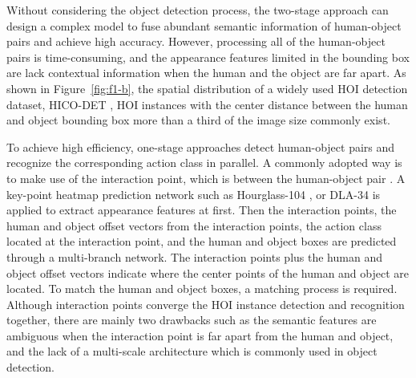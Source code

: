\documentclass[10pt,twocolumn,letterpaper]{article}
\begin{document}
Without considering the object detection process, the two-stage approach can design a complex model to fuse abundant semantic information of human-object pairs and achieve high accuracy.
However, processing all of the human-object pairs is time-consuming, and the appearance features limited in the bounding box are lack contextual information when the human and the object are far apart.
As shown in Figure~\ref{fig:f1-b}, the spatial distribution of a widely used HOI detection dataset, HICO-DET \cite{chao2018learning}, HOI instances with the center distance between the human and object bounding box more than a third of the image size commonly exist.

To achieve high efficiency, one-stage approaches
\cite{gkioxari2018detecting,liao2020ppdm,kim2021hotr,zou2021end,chen2021reformulating,tamura2021qpic,
   zhong2021glance,kim2020uniondet,wang2020learning}
detect human-object pairs and recognize the corresponding action class in parallel.
A commonly adopted way is to make use of the interaction point, which is between the human-object pair \cite{liao2020ppdm,zhong2021glance,wang2020learning}.
A key-point heatmap prediction network such as Hourglass-104 \cite{newell2016stacked}, or DLA-34 \cite{yu2018deep} is applied to extract appearance features at first.
Then the interaction points, the human and object offset vectors from the interaction points, the action class located at the interaction point, and the human and object boxes are predicted through a multi-branch network.
The interaction points plus the human and object offset vectors indicate where the center points of the human and object are located.
To match the human and object boxes, a matching process is required.
Although interaction points converge the HOI instance detection and recognition together, there are mainly two drawbacks such as the semantic features are ambiguous when the interaction point is far apart from the human and object, and the lack of a multi-scale architecture which is commonly used in object detection.
\end{document}
